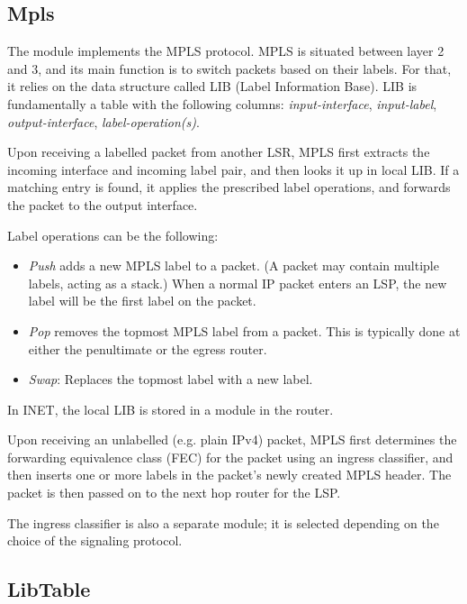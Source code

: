 \subsection{Mpls}
\label{sec:mpls:mpls}

The  module implements the MPLS protocol. MPLS is situated between
layer 2 and 3, and its main function is to switch packets based on their labels.
For that, it relies on the data structure called LIB (Label Information Base).
LIB is fundamentally a table with the following columns: \textit{input-interface},
\textit{input-label}, \textit{output-interface}, \textit{label-operation(s)}.

Upon receiving a labelled packet from another LSR, MPLS first extracts the
incoming interface and incoming label pair, and then looks it up in local LIB.
If a matching entry is found, it applies the prescribed label operations, and
forwards the packet to the output interface.

Label operations can be the following:

\begin{itemize}
  \item \textit{Push} adds a new MPLS label to a packet. (A packet may
     contain multiple labels, acting as a stack.) When a normal IP packet
     enters an LSP, the new label will be the first label on the packet.
  \item \textit{Pop} removes the topmost MPLS label from a packet.
     This is typically done at either the penultimate or the egress router.
  \item \textit{Swap}: Replaces the topmost label with a new label.
\end{itemize}

In INET, the local LIB is stored in a  module in the router.

Upon receiving an unlabelled (e.g. plain IPv4) packet, MPLS first determines the
forwarding equivalence class (FEC) for the packet using an ingress classifier,
and then inserts one or more labels in the packet's newly created MPLS header.
The packet is then passed on to the next hop router for the LSP.

The ingress classifier is also a separate module; it is selected depending
on the choice of the signaling protocol.


\subsection{LibTable}
\label{sec:mpls:libtable}

